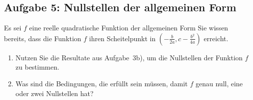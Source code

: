 \documentclass[12pt]{article}
\begin{document}
\subsection*{Aufgabe 5: Nullstellen der allgemeinen Form}
Es sei $f$ eine reelle quadratische Funktion der allgemeinen Form 
Sie wissen bereits, dass die Funktion $f$ ihren Scheitelpunkt in $\left(-\frac{b}{2a}, c-\frac{b^2}{4a}\right)$ erreicht.
\begin{enumerate}[label=\alph*)]
\item Nutzen Sie die Resultate aus Aufgabe~3b), um die Nullstellen der Funktion $f$ zu bestimmen.
\item Was sind die Bedingungen, die erfüllt sein müssen, damit $f$ genau null, eine oder zwei Nullstellen hat?
\end{enumerate}
\end{document}
